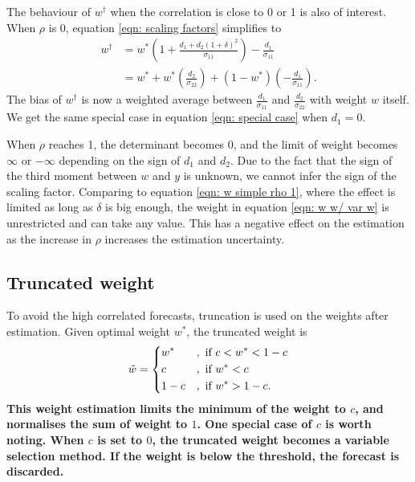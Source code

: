 \documentclass[11pt]{article}
\begin{document}
The behaviour of $w^\dagger$ when the correlation is close to 0 or 1 is also of interest. When $\rho$ is 0, equation \ref{eqn: scaling factors} simplifies to 
\begin{equation}
\label{eqn: scaling factor rho 0}
\begin{aligned}
w^\dagger &= w^*(1+\frac{d_1 + d_2 (1+\delta)^2} {\sigma_{11} }) - \frac{d_1}{\sigma_{11}}\\
&=w^* +w^*(\frac{d_2}{\sigma_{22} }) + (1-w^*)(-\frac{d_1}{\sigma_{11}}).
\end{aligned}
\end{equation}
The bias of $w^\dagger$ is now a weighted average between $\frac{d_1}{\sigma_{11}}$ and $\frac{d_2}{\sigma_{22}}$ with weight $w$ itself. We get the same special case in equation \ref{eqn: special case} when $d_1=0$.

When $\rho$ reaches 1, the determinant becomes 0, and the limit of weight becomes $\infty$ or $-\infty$ depending on the sign of $d_1$ and $d_2$. Due to the fact that the sign of the third moment between $w$ and $y$ is unknown, we cannot infer the sign of the scaling factor. Comparing to equation \ref{eqn: w simple rho 1}, where the effect is limited as long as $\delta$ is big enough, the weight in equation \ref{eqn: w w/ var w} is unrestricted and can take any value. This has a negative effect on the estimation as the increase in $\rho$ increases the estimation uncertainty.

\subsection{Truncated weight}\label{truncated-weight}

To avoid the high correlated forecasts, truncation is  used on the
weights after estimation. Given optimal weight $w^*$, the truncated weight is 
\begin{equation}
\label{eqn: w trunc}
\tilde{w} = 
\begin{dcases}
w^* &, \text{ if } c<w^*<1-c \\
c &, \text{ if } w^*<c \\
1-c &, \text{ if } w^*>1-c.
\end{dcases}
\end{equation}
\textbf{This weight estimation limits the minimum of the weight to $c$, and normalises the sum of weight to $1$. 
One special case of $c$ is worth noting. When $c$ is set to $0$, the truncated weight becomes a variable selection method. If the weight is below the threshold, the forecast is discarded.}
\end{document}

